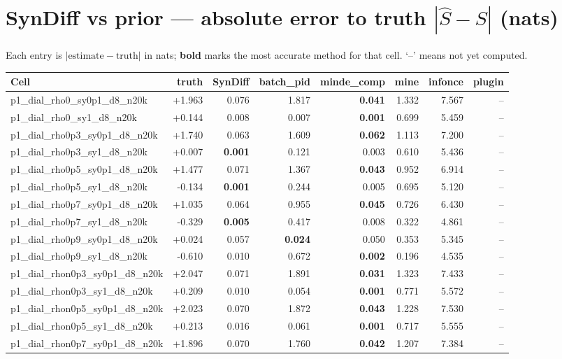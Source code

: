 \documentclass[11pt]{article}
\begin{document}
\section*{SynDiff vs prior --- absolute error to truth $|\hat S - S|$ (nats)}
Each entry is $|\text{estimate}-\text{truth}|$ in nats; \textbf{bold} marks the most accurate method for that cell. `--' means not yet computed.
\footnotesize\begin{longtable}{lrrrrrrr}\toprule Cell & truth & \textbf{SynDiff} & batch\_pid & minde\_comp & mine & infonce & plugin\\\midrule\endhead
p1\_dial\_rho0\_sy0p1\_d8\_n20k & +1.963 & 0.076 & 1.817 & \textbf{0.041} & 1.332 & 7.567 & --\\
p1\_dial\_rho0\_sy1\_d8\_n20k & +0.144 & 0.008 & 0.007 & \textbf{0.001} & 0.699 & 5.459 & --\\
p1\_dial\_rho0p3\_sy0p1\_d8\_n20k & +1.740 & 0.063 & 1.609 & \textbf{0.062} & 1.113 & 7.200 & --\\
p1\_dial\_rho0p3\_sy1\_d8\_n20k & +0.007 & \textbf{0.001} & 0.121 & 0.003 & 0.610 & 5.436 & --\\
p1\_dial\_rho0p5\_sy0p1\_d8\_n20k & +1.477 & 0.071 & 1.367 & \textbf{0.043} & 0.952 & 6.914 & --\\
p1\_dial\_rho0p5\_sy1\_d8\_n20k & -0.134 & \textbf{0.001} & 0.244 & 0.005 & 0.695 & 5.120 & --\\
p1\_dial\_rho0p7\_sy0p1\_d8\_n20k & +1.035 & 0.064 & 0.955 & \textbf{0.045} & 0.726 & 6.430 & --\\
p1\_dial\_rho0p7\_sy1\_d8\_n20k & -0.329 & \textbf{0.005} & 0.417 & 0.008 & 0.322 & 4.861 & --\\
p1\_dial\_rho0p9\_sy0p1\_d8\_n20k & +0.024 & 0.057 & \textbf{0.024} & 0.050 & 0.353 & 5.345 & --\\
p1\_dial\_rho0p9\_sy1\_d8\_n20k & -0.610 & 0.010 & 0.672 & \textbf{0.002} & 0.196 & 4.535 & --\\
p1\_dial\_rhon0p3\_sy0p1\_d8\_n20k & +2.047 & 0.071 & 1.891 & \textbf{0.031} & 1.323 & 7.433 & --\\
p1\_dial\_rhon0p3\_sy1\_d8\_n20k & +0.209 & 0.010 & 0.054 & \textbf{0.001} & 0.771 & 5.572 & --\\
p1\_dial\_rhon0p5\_sy0p1\_d8\_n20k & +2.023 & 0.070 & 1.872 & \textbf{0.043} & 1.228 & 7.530 & --\\
p1\_dial\_rhon0p5\_sy1\_d8\_n20k & +0.213 & 0.016 & 0.061 & \textbf{0.001} & 0.717 & 5.555 & --\\
p1\_dial\_rhon0p7\_sy0p1\_d8\_n20k & +1.896 & 0.070 & 1.760 & \textbf{0.042} & 1.207 & 7.384 & --\\

\end{longtable}
\end{document}

